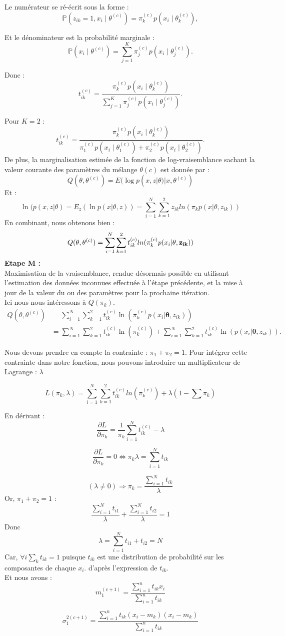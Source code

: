 \documentclass[12pt]{article}
\begin{document}
Le numérateur se ré-écrit sous la forme :
\[
\mathbb{P}(z_{ik} = 1, x_i \mid \theta^{(c)}) = \pi_k^{(c)} p(x_i \mid \theta_k^{(c)}),
\]

Et le dénominateur est la probabilité marginale :
\[
\mathbb{P}(x_i \mid \theta^{(c)}) = \sum_{j=1}^K \pi_j^{(c)} p(x_i \mid \theta_j^{(c)}).
\]

Donc :
\[
t_{ik}^{(c)} = \frac{\pi_k^{(c)} p(x_i \mid \theta_k^{(c)})}{\sum_{j=1}^K \pi_j^{(c)} p(x_i \mid \theta_j^{(c)})}.
\]

Pour \( K = 2 \) :
\[
t_{ik}^{(c)} = \frac{\pi_k^{(c)} p(x_i \mid \theta_k^{(c)})}{\pi_1^{(c)} p(x_i \mid \theta_1^{(c)}) + \pi_2^{(c)} p(x_i \mid \theta_2^{(c)})}.
\]
De plus, la marginalisation estimée de la fonction de log-vraisemblance sachant la valeur courante des paramètres du mélange $\theta (c)$  est donnée par :
\[
Q(\theta, \theta^{(c)}) = E(\log p(x,z |\theta) |x, \theta^{(c)})
\]
Et :
\[
\ln(p(x,z|\theta) = E_z(\ln p(x|\theta,z)) = \sum_{i=1}^{N} \sum_{k=1}^{2} z_{ik} ln(\pi_k p(x|\theta, z_{ik}))
\]
En combinant, nous obtenons bien : 
\[
Q(\theta, \theta^{(c)}) = \sum_{i=1}^{N} \sum_{k=1}^{2} t_{ik}^{(c)} ln(\pi_k^{(c)} p(x_i|\bf{\theta}, z_{ik}))
\]
\textbf{Etape M :}\\
Maximisation de la vraisemblance, rendue désormais possible en utilisant l’estimation des données inconnues effectuée à l’étape précédente, et la mise à jour de la valeur du ou des paramètres pour la prochaine itération.\\
Ici nous nous intéressons à $Q(\pi_k)$.
\[
\begin{aligned}
Q(\theta, \theta^{(c)}) &= \sum_{i=1}^{N} \sum_{k=1}^{2} t_{ik}^{(c)} \ln(\pi_k^{(c)} p(x_i|\boldsymbol{\theta}, z_{ik})) \\
&= \sum_{i=1}^{N} \sum_{k=1}^{2} t_{ik}^{(c)} \ln(\pi_k^{(c)}) + \sum_{i=1}^{N} \sum_{k=1}^{2} t_{ik}^{(c)} \ln(p(x_i|\boldsymbol{\theta}, z_{ik})).
\end{aligned}
\]

Nous devons prendre en compte la contrainte : $\pi_1 + \pi_2 = 1$. Pour intégrer cette contrainte dans notre fonction, nous pouvons introduire un multiplicateur de Lagrange : $\lambda$

\[
L(\pi_k, \lambda) = \sum_{i=1}^{N} \sum_{k=1}^{2} t_{ik}^{(c)} ln(\pi_k^{(c)}) + \lambda (1- \sum \pi_k)
\]

En dérivant :
\[
\frac{\partial L}{\partial \pi_k} = \frac{1}{\pi_k} \sum_{i=1}^{N} t_{ik}^{(c)} - \lambda
\]

\[
\frac{\partial L}{\partial \pi_k} = 0 \Leftrightarrow \pi_k \lambda = \sum_{i=1}^{N} t_{ik}
\]

\[
 (\lambda \neq 0) \Rightarrow \pi_k  = \frac{\sum_{i=1}^{N} t_{ik}}{\lambda}
\]
Or, $\pi_1 + \pi_2 = 1$ : 
\[
  \frac{\sum_{i=1}^{N} t_{i1}}{\lambda} +\frac{\sum_{i=1}^{N} t_{i2}}{\lambda} = 1
\]
Donc $$\lambda = \sum_{i=1}^{N} t_{i1}+ t_{i2} = N$$ 
Car, $\forall i \sum_k t_{ik}=1$ puisque $t_{ik}$ est une distribution de probabilité sur les composantes de chaque $x_i$. d'après l'expression de $t_{ik}$.\\
Et nous avons : 
\[
m_1^{(c+1)} = \frac{\sum_{i=1}^{n} t_{ik} x_i}{\sum_{i=1}^{n} t_{ik}}
\]

\[
\sigma_1^{2(c+1)} = \frac{\sum_{i=1}^{n} t_{ik} (x_i-m_k)(x_i-m_k)}{\sum_{i=1}^{n} t_{ik}}
\]
\end{document}
